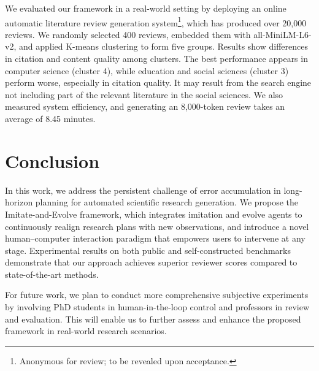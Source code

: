 \documentclass[manuscript,review,anonymous]{acmart}
\begin{document}
We evaluated our framework in a real-world setting by deploying an online automatic literature review generation system\footnote{Anonymous for review; to be revealed upon acceptance.}, which has produced over 20,000 reviews. We randomly selected 400 reviews, embedded them with all-MiniLM-L6-v2, and applied K-means clustering to form five groups. Results show differences in citation and content quality among clusters. The best performance appears in computer science (cluster 4), while education and social sciences (cluster 3) perform worse, especially in citation quality. It may result from the search engine not including part of the relevant literature in the social sciences. We also measured system efficiency, and generating an 8,000-token review takes an average of 8.45 minutes.

\section{Conclusion}

In this work, we address the persistent challenge of error accumulation in long-horizon planning for automated scientific research generation. We propose the Imitate-and-Evolve framework, which integrates imitation and evolve agents to continuously realign research plans with new observations, and introduce a novel human–computer interaction paradigm that empowers users to intervene at any stage. Experimental results on both public and self-constructed benchmarks demonstrate that our approach achieves superior reviewer scores compared to state-of-the-art methods.

For future work, we plan to conduct more comprehensive subjective experiments by involving PhD students in human-in-the-loop control and professors in review and evaluation. This will enable us to further assess and enhance the proposed framework in real-world research scenarios.



\end{document}
